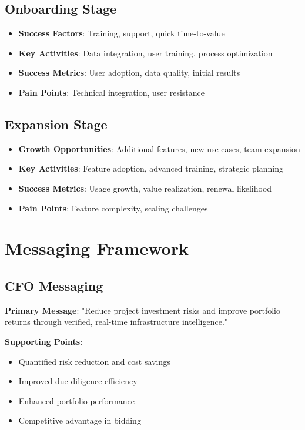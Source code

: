 \documentclass[business]{../templates/infraradar-main}
\begin{document}
\subsection{Onboarding Stage}
\begin{itemize}
    \item \textbf{Success Factors}: Training, support, quick time-to-value
    \item \textbf{Key Activities}: Data integration, user training, process optimization
    \item \textbf{Success Metrics}: User adoption, data quality, initial results
    \item \textbf{Pain Points}: Technical integration, user resistance
\end{itemize}

\subsection{Expansion Stage}
\begin{itemize}
    \item \textbf{Growth Opportunities}: Additional features, new use cases, team expansion
    \item \textbf{Key Activities}: Feature adoption, advanced training, strategic planning
    \item \textbf{Success Metrics}: Usage growth, value realization, renewal likelihood
    \item \textbf{Pain Points}: Feature complexity, scaling challenges
\end{itemize}

\section{Messaging Framework}

\subsection{CFO Messaging}
\textbf{Primary Message}: "Reduce project investment risks and improve portfolio returns through verified, real-time infrastructure intelligence."

\textbf{Supporting Points}:
\begin{itemize}
    \item Quantified risk reduction and cost savings
    \item Improved due diligence efficiency
    \item Enhanced portfolio performance
    \item Competitive advantage in bidding
\end{itemize}
\end{document}
